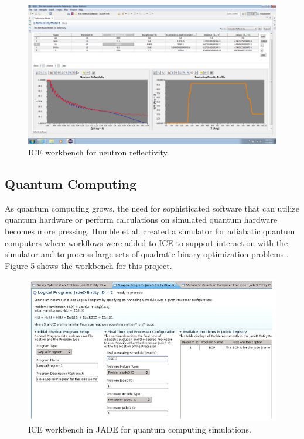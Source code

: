 \begin{figure}[H]
\centering
\includegraphics[width=\textwidth]{images/reflectivity-screenshot.png}
\caption{ICE workbench for neutron reflectivity.}
\end{figure}

\subsection{Quantum Computing}\label{quantum-computing}

As quantum computing grows, the need for sophisticated
software that can utilize quantum hardware or perform calculations on
simulated quantum hardware becomes more pressing. Humble et al. created a simulator for
adiabatic quantum computers where workflows were added to ICE to support
interaction with the simulator and to process large sets of
quadratic binary optimization problems \cite{humble_integrated_2014}. Figure 5
shows the workbench for this project.

\begin{figure}[H]
\centering
\includegraphics[width=\textwidth]{images/jaded.png}
\caption{ICE workbench in JADE for quantum computing simulations.}
\end{figure}

